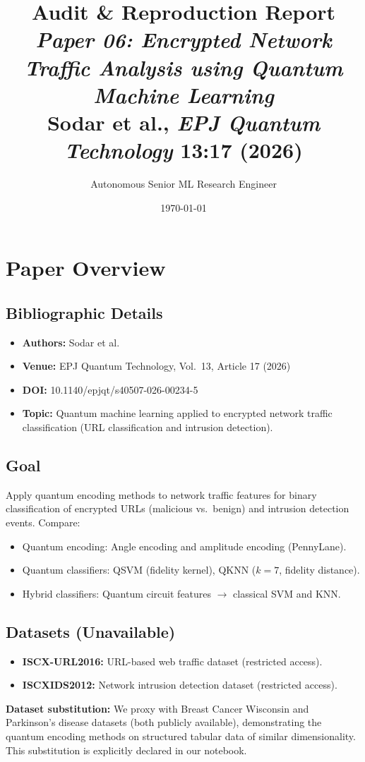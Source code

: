 \documentclass[12pt,a4paper]{article}
\title{\textbf{Audit \& Reproduction Report}\\[0.4em]
\large\textit{Paper 06: Encrypted Network Traffic Analysis using Quantum Machine Learning}\\[0.3em]
Sodar et al., \textit{EPJ Quantum Technology} 13:17 (2026)}
\author{Autonomous Senior ML Research Engineer}
\date{\today}
\begin{document}
\maketitle
\tableofcontents
\newpage

\section{Paper Overview}
\subsection{Bibliographic Details}
\begin{itemize}[leftmargin=*]
  \item \textbf{Authors:} Sodar et al.
  \item \textbf{Venue:} EPJ Quantum Technology, Vol.~13, Article 17 (2026)
  \item \textbf{DOI:} 10.1140/epjqt/s40507-026-00234-5
  \item \textbf{Topic:} Quantum machine learning applied to encrypted network traffic classification (URL classification and intrusion detection).
\end{itemize}

\subsection{Goal}
Apply quantum encoding methods to network traffic features for binary classification of encrypted URLs (malicious vs.\ benign) and intrusion detection events. Compare:
\begin{itemize}[leftmargin=*]
  \item Quantum encoding: Angle encoding and amplitude encoding (PennyLane).
  \item Quantum classifiers: QSVM (fidelity kernel), QKNN ($k=7$, fidelity distance).
  \item Hybrid classifiers: Quantum circuit features $\to$ classical SVM and KNN.
\end{itemize}

\subsection{Datasets (Unavailable)}
\begin{itemize}[leftmargin=*]
  \item \textbf{ISCX-URL2016:} URL-based web traffic dataset (restricted access).
  \item \textbf{ISCXIDS2012:} Network intrusion detection dataset (restricted access).
\end{itemize}
\textbf{Dataset substitution:} We proxy with Breast Cancer Wisconsin and Parkinson's disease datasets (both publicly available), demonstrating the quantum encoding methods on structured tabular data of similar dimensionality. This substitution is explicitly declared in our notebook.
\end{document}
